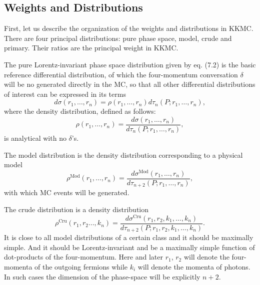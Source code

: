 \subsection{Weights and Distributions}
First, let us describe the organization of the weights and distributions in KKMC. There are four principal distributions: pure phase space, model, crude and primary. Their ratios are the principal weight in KKMC.

The pure Lorentz-invariant phase space distribution given by eq. (7.2) is the basic reference differential distribution, of which the four-momentum conversation $\delta$ will be no generated directly in the MC, so that all other differential distributions of interest can be expressed in its terms
\begin{equation}
d\sigma(r_1,\ldots,r_n)=\rho(r_1,\ldots,r_n)d\tau_n(P;r_1,\ldots,r_n),
\end{equation}
where the density distribution, defined as follows:
\begin{equation}
\rho(r_1,\ldots,r_n)=\frac{d\sigma(r_1,\ldots,r_n)}{d\tau_n(P;r_1,\ldots,r_n)},
\end{equation}
is analytical with no $\delta$'s. 

The model distribution is the density distribution corresponding to a physical model
\begin{equation}
\rho^\text{Mod}(r_1,\ldots,r_n)=\frac{d\sigma^\text{Mod}(r_1,\ldots,r_n)}{d\tau_{n+2}(P;r_1,\ldots,r_n)},
\end{equation}
with which MC events will be generated.

The crude distribution is a density distribution 
\begin{equation}
\rho^\text{Cru}(r_1,r_2\ldots,k_n)=\frac{d\sigma^\text{Cru}(r_1,r_2,k_1,\ldots,k_n)}{d\tau_{n+2}(P;r_1,r_2,k_1,\ldots,k_n)}.
\end{equation}
It is close to all model distributions of a certain class and it should be maximally simple. And it should be Lorentz-invariant and be a maximally simple function of dot-products of the four-momentum. Here and later $r_1$, $r_2$ will denote the four-momenta of the outgoing fermions while $k_i$ will denote the momenta of photons. In such cases the dimension of the phase-space will be explicitly $n+2$.

